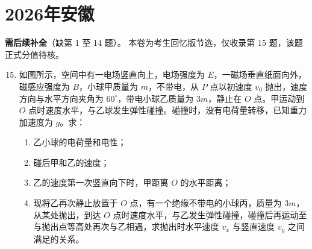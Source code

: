 \documentclass[\gkver]{gaokaozhenti}
\begin{document}
\chapter{2026年安徽}
\textbf{需后续补全}（缺第 1 至 14 题）。
本卷为考生回忆版节选，仅收录第 15 题，该题正式分值待核。

\begin{enumerate}
\setcounter{enumi}{14}
\item
如图所示，空间中有一电场竖直向上，电场强度为 $E$，一磁场垂直纸面向外，磁感应强度为 $B$，小球甲质量为 $m$，不带电，从 $P$ 点以初速度 $v_0$ 抛出，速度方向与水平方向夹角为 $60^\circ$，带电小球乙质量为 $3m$，静止在 $O$ 点。甲运动到 $O$ 点时速度水平，与乙球发生弹性碰撞。碰撞时，没有电荷量转移，已知重力加速度为 $g$。求：
\begin{enumerate}
  \item 乙小球的电荷量和电性；
  \item 碰后甲和乙的速度；
  \item 乙的速度第一次竖直向下时，甲距离 $O$ 的水平距离；
  \item 现将乙再次静止放置于 $O$ 点，有一个绝缘不带电的小球丙，质量为 $3m$，从某处抛出，到达 $O$ 点时速度水平，与乙发生弹性碰撞，碰撞后再运动至与抛出点等高处再次与乙相遇，求抛出时水平速度 $v_x$ 与竖直速度 $v_y$ 之间满足的关系。
\end{enumerate}
\end{enumerate}
\end{document}
